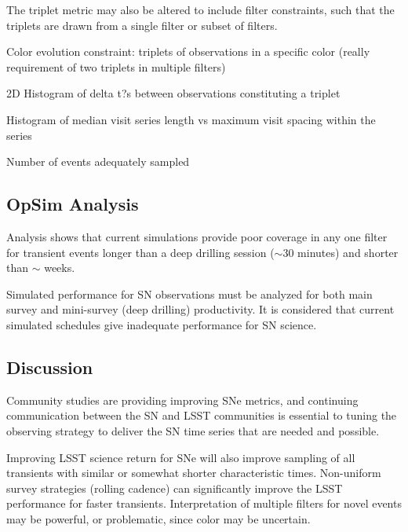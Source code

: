 The triplet metric may also be altered to include filter constraints, such that the triplets are drawn from a single filter or subset of filters.

Color evolution constraint: triplets of observations in a specific color (really requirement of two triplets in multiple filters)

  2D Histogram of delta t?s between observations constituting a triplet

Histogram of median visit series length vs maximum visit spacing within the series

Number of events adequately sampled


\subsection{OpSim Analysis}
\label{sec:\secname:analysis}

Analysis shows that current simulations provide  poor coverage in any one filter for transient events longer than a deep drilling session ($\sim$30 minutes) and shorter than $\sim$ weeks.

Simulated performance for SN observations must be analyzed for both main survey and mini-survey (deep drilling) productivity.  It is considered that current simulated schedules give inadequate performance for SN science.




\subsection{Discussion}
\label{sec:\secname:discussion}

Community studies are providing improving SNe metrics, and continuing communication between the SN and LSST communities is essential to tuning the observing strategy to deliver the SN time series that are needed and possible.

Improving LSST science return for SNe will also improve sampling of all transients with similar or somewhat shorter characteristic times.  Non-uniform survey strategies (rolling cadence) can significantly improve the LSST performance for faster transients.  Interpretation of multiple filters for novel events may be powerful, or problematic, since color may be uncertain.

